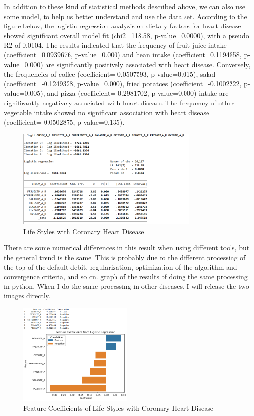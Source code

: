 \documentclass{article}
\begin{document}
In addition to these kind of statistical methods described above, we can also use some model, to help us better understand and use the data set. According to the figure below, the logistic regression analysis on dietary factors for heart disease showed significant overall model fit (chi2=118.58, p-value=0.0000), with a pseudo R2 of 0.0104. The results indicated that the frequency of fruit juice intake (coefficient=0.0939676, p-value=0.000) and bean intake (coefficient=0.1194858, p-value=0.000) are significantly positively associated with heart disease. Conversely, the frequencies of coffee (coefficient=-0.0507593, p-value=0.015), salad (coefficient=-0.1249328, p-value=0.000), fried potatoes (coefficient=-0.1002222, p-value=0.005), and pizza (coefficient=-0.2981702, p-value=0.000) intake are significantly negatively associated with heart disease. The frequency of other vegetable intake showed no significant association with heart disease (coefficient=-0.0502875, p-value=0.135).

\begin{figure}[!h]
	\centering
	\includegraphics[width=0.8\textwidth]{../Image/L_C.jpg}
	\caption{Life Styles with Coronary Heart Disease}
	\label{fig:G5}
\end{figure}

There are some numerical differences in this result when using different tools, but the general trend is the same. This is probably due to the different processing of the top of the default debit, regularization, optimization of the algorithm and convergence criteria, and so on. graph of the results of doing the same processing in python. When I do the same processing in other diseases, I will release the two images directly.


\begin{figure}[!h]
	\centering
	\includegraphics[width=0.5\textwidth]{../Image/P4.png}
	\caption{Feature Coefficients of Life Styles with Coronary Heart Disease}
	\label{fig:P4}
\end{figure}
\end{document}
